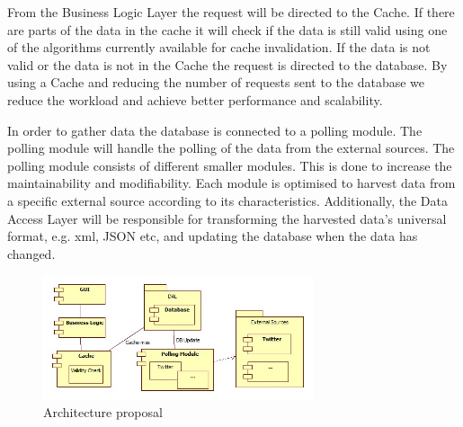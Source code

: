\documentclass{article}
\begin{document}
From the Business Logic Layer the request will be directed to the
Cache. If there are parts of the data in the cache it will check if the data is
still valid using one of the algorithms currently available for cache
invalidation. If the data is not valid or the data is not in the Cache the
request is directed to the database. By using a Cache and reducing the number
of requests sent to the database we reduce the workload and achieve better
performance and scalability.

In order to gather data the database is connected to a polling module. The
polling module will handle the polling of the data from the external sources.
The polling module consists of different smaller modules. This is done to increase the maintainability and modifiability.
Each module is optimised to harvest data from a specific external source according to its
characteristics. Additionally, the Data Access Layer will be responsible for transforming the
harvested data's universal format, e.g. xml, JSON etc, and updating the database when the data has changed.

\begin{figure}[!]
\centering
\includegraphics[width=300px]{ProposedSolution}
\caption{Architecture proposal}
\label{fig:fig6}
\end{figure}


\newpage

\nocite{*}


\end{document}
